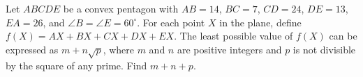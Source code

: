 Let $ABCDE$ be a convex pentagon with $AB=14$, $BC=7$, $CD=24$, $DE=13$, $EA=26$, and $\angle B=\angle E=60^{\circ}$. For each point $X$ in the plane, define $f(X)=AX+BX+CX+DX+EX$. The least possible value of $f(X)$ can be expressed as $m+n\sqrt{p}$, where $m$ and $n$ are positive integers and $p$ is not divisible by the square of any prime. Find $m+n+p$.